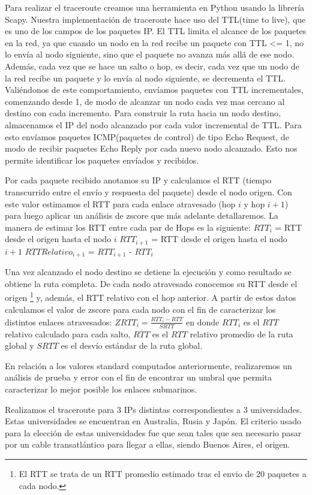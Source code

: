 Para realizar el traceroute creamos una herramienta en Python usando la librería Scapy. 
Nuestra implementación de traceroute hace uso del TTL(time to live), que es uno de los campos de los paquetes IP. El TTL limita el alcance de los paquetes en la red, ya que cuando un nodo en la red recibe un paquete con TTL <= 1, no lo envía al nodo siguiente, sino que el paquete no avanza más allá de ese nodo. Además, cada vez que se hace un salto o hop, es decir, cada vez que un nodo de la red recibe un paquete y lo envía al nodo siguiente, se decrementa el TTL. Valiéndonos de este comportamiento, envíamos paquetes con TTL incrementales, comenzando desde 1, de modo de alcanzar un nodo cada vez mas cercano al destino con cada incremento.
Para construir la ruta hacia un nodo destino, almacenamos el IP del nodo alcanzado por cada valor incremental de TTL. Para esto envíamos paquetes ICMP(paquetes de control) de tipo Echo Request, de modo de recibir paquetes Echo Reply por cada nuevo nodo alcanzado. Esto nos permite identificar los paquetes envíados y recibidos. 

Por cada paquete recibido anotamos su IP y calculamos el RTT (tiempo transcurrido entre el envío y respuesta del paquete) desde el nodo origen. Con este valor estimamos el RTT para cada enlace atravesado (hop $i$ y hop $i+1$) para luego aplicar un análisis de zscore que más adelante detallaremos. La manera de estimar los RTT entre cada par de Hops es la siguiente:
\newline
\newline
$RTT_i$ = RTT desde el origen hasta el nodo $i$
\newline
$RTT_{i+1}$ = RTT desde el origen hasta el nodo $i+1$
\newline
$RTTRelativo_{i+1}$ = $RTT_{i+1}$ - $RTT_i$
\newline

Una vez alcanzado el nodo destino se detiene la ejecución y como resultado se obtiene la ruta completa. De cada nodo atravesado conocemos su RTT desde el origen \footnote{El RTT se trata de un RTT promedio estimado tras el envio de 20 paquetes a cada nodo.} y, además, el RTT relativo con el hop anterior. A partir de estos datos calculamos el valor de zscore para cada nodo con el fin de caracterizar los distintos enlaces atravesados:
\newline
\newline
$ZRTT_i = \frac{RTT_i-\overline{RTT}}{SRTT}$
en donde $RTT_i$ es el $RTT$ relativo calculado para cada salto, $\overline{RTT}$ es el $RTT$ relativo promedio de la ruta global y $SRTT$ es el desvío estándar de la ruta global.
\newline

En relación a los valores standard computados anteriormente, realizaremos un análisis de prueba y error con el fin de encontrar un umbral que permita caracterizar lo mejor posible los enlaces submarinos.

Realizamos el traceroute para 3 IPs distintas correspondientes a 3 universidades. Estas universidades se encuentran en Australia, Rusia y Japón. El criterio usado para la elección de estas universidades fue que sean tales que sea necesario pasar por un cable transatlántico para llegar a ellas, siendo Buenos Aires, el origen.